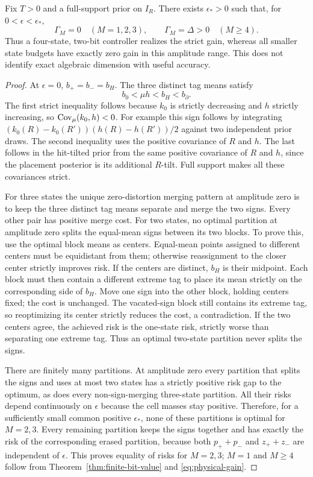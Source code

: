\begin{corollary}\label{cor:threshold}
Fix $T>0$ and a full-support prior on $I_R$. There exists
$\epsilon_*>0$ such that, for $0<\epsilon<\epsilon_*$,
\begin{equation}\label{eq:threshold}
 \Gamma_M=0\quad(M=1,2,3),\qquad
 \Gamma_M=\Delta>0\quad(M\ge4).
\end{equation}
Thus a four-state, two-bit controller realizes the strict gain, whereas
all smaller state budgets have exactly zero gain in this amplitude range.
This does not identify exact algebraic dimension with useful accuracy.
\end{corollary}
\begin{proof}
At $\epsilon=0$, $b_+=b_-=b_H$. The three distinct tag means satisfy
\[
 b_0<\mu h<b_H<b_\partial.
\]
The first strict inequality follows because $k_0$ is strictly decreasing
and $h$ strictly increasing, so $\operatorname{Cov}_\mu(k_0,h)<0$.
For example this sign follows by integrating
$(k_0(R)-k_0(R'))(h(R)-h(R'))/2$ against two independent prior draws.
The second inequality uses the positive covariance of $R$ and $h$.
The last follows in the hit-tilted prior from the same positive covariance
of $R$ and $h$, since the placement posterior is its additional $R$-tilt.
Full support makes all these covariances strict.

For three states the unique zero-distortion merging pattern at amplitude
zero is to keep the three distinct tag means separate and merge the two
signs. Every other pair has positive merge cost. For two states, no optimal
partition at amplitude zero splits the equal-mean signs between its two
blocks. To prove this, use the optimal block means as centers. Equal-mean
points assigned to different centers must be equidistant from them;
otherwise reassignment to the closer center strictly improves risk.
If the centers are distinct, $b_H$ is their midpoint. Each block must
then contain a different extreme tag to place its mean strictly on the
corresponding side of $b_H$. Move one sign into the other block, holding
centers fixed; the cost is unchanged. The vacated-sign block still contains
its extreme tag, so reoptimizing its center strictly reduces the cost,
a contradiction. If the two centers agree, the achieved risk is the
one-state risk, strictly worse than separating one extreme tag. Thus an
optimal two-state partition never splits the signs.

There are finitely many partitions. At amplitude zero every partition
that splits the signs and uses at most two states has a strictly positive
risk gap to the optimum, as does every non-sign-merging three-state
partition. All their risks depend continuously on $\epsilon$ because
the cell masses stay positive. Therefore, for a sufficiently small common
positive $\epsilon_*$, none of these partitions is optimal for $M=2,3$.
Every remaining partition keeps the signs together and has exactly the
risk of the corresponding erased partition, because both $p_++p_-$
and $z_++z_-$ are independent of $\epsilon$. This proves equality of
risks for $M=2,3$; $M=1$ and $M\ge4$ follow from
Theorem~\ref{thm:finite-bit-value} and \eqref{eq:physical-gain}.
\end{proof}

